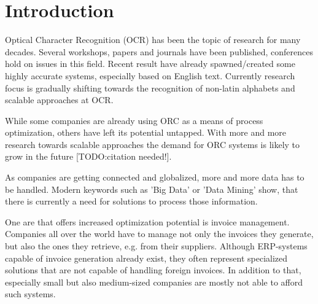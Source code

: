%
% 

\chapter{Introduction}
\label{cha1}
Optical Character Recognition (OCR) has been the topic of research for many decades. 
Several workshops, papers and journals have been published, conferences hold on issues in this field. %
Recent result have already spawned/created some highly accurate systems, especially based on English text. Currently research focus is gradually shifting towards the recognition of non-latin alphabets and scalable approaches at OCR. %

While some companies are already using ORC as a means of process optimization, others have left its potential untapped. With more and more research towards scalable approaches the demand for ORC systems is likely to grow in the future [TODO:citation needed!].

As companies are getting connected and globalized, more and more data has to be handled. Modern keywords such as 'Big Data' or 'Data Mining' show, that there is currently a need for solutions to process those information.

One are that offers increased optimization potential is invoice management. Companies all over the world have to manage not only the invoices they generate, but also the ones they retrieve, e.g. from their suppliers.
Although ERP-systems capable of invoice generation already exist, they often represent specialized solutions that are not capable of handling foreign invoices. In addition to that, especially small but also medium-sized companies are mostly not able to afford such systems. 

